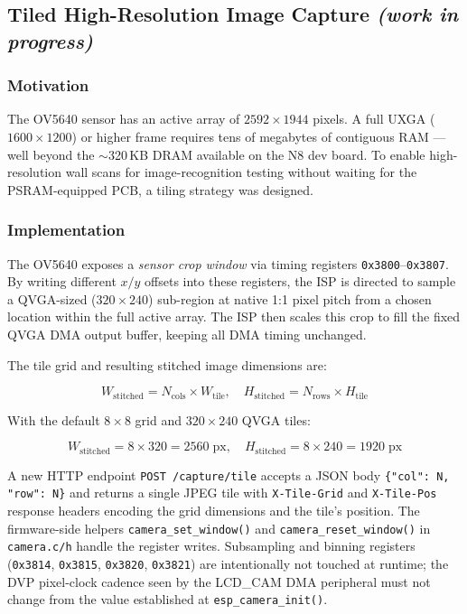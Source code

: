 \documentclass[12pt]{article}
\begin{document}
\subsection{Tiled High-Resolution Image Capture \textnormal{\textit{(work in progress)}}}

\subsubsection{Motivation}

The OV5640 sensor has an active array of $2592 \times 1944$ pixels.  A full
UXGA ($1600 \times 1200$) or higher frame requires tens of megabytes of
contiguous RAM --- well beyond the $\sim$320\,KB DRAM available on the N8 dev
board.  To enable high-resolution wall scans for image-recognition testing
without waiting for the PSRAM-equipped PCB, a tiling strategy was designed.

\subsubsection{Implementation}

The OV5640 exposes a \textit{sensor crop window} via timing registers
\texttt{0x3800}--\texttt{0x3807}.  By writing different $x/y$ offsets into
these registers, the ISP is directed to sample a QVGA-sized ($320 \times 240$)
sub-region at native 1:1 pixel pitch from a chosen location within the full
active array.  The ISP then scales this crop to fill the fixed QVGA DMA output
buffer, keeping all DMA timing unchanged.

The tile grid and resulting stitched image dimensions are:

\begin{equation}
  W_{\text{stitched}} = N_{\text{cols}} \times W_{\text{tile}}, \quad
  H_{\text{stitched}} = N_{\text{rows}} \times H_{\text{tile}}
\end{equation}

With the default $8 \times 8$ grid and $320 \times 240$ QVGA tiles:

\begin{equation}
  W_{\text{stitched}} = 8 \times 320 = 2560\;\text{px}, \quad
  H_{\text{stitched}} = 8 \times 240 = 1920\;\text{px}
\end{equation}

A new HTTP endpoint \texttt{POST /capture/tile} accepts a JSON body
\texttt{\{"col": N, "row": N\}} and returns a single JPEG tile with
\texttt{X-Tile-Grid} and \texttt{X-Tile-Pos} response headers encoding the grid
dimensions and the tile's position.  The firmware-side helpers
\texttt{camera\_set\_window()} and \texttt{camera\_reset\_window()} in
\texttt{camera.c/h} handle the register writes.  Subsampling and binning
registers (\texttt{0x3814}, \texttt{0x3815}, \texttt{0x3820}, \texttt{0x3821})
are intentionally not touched at runtime; the DVP pixel-clock cadence seen by
the LCD\_CAM DMA peripheral must not change from the value established at
\texttt{esp\_camera\_init()}.
\end{document}
